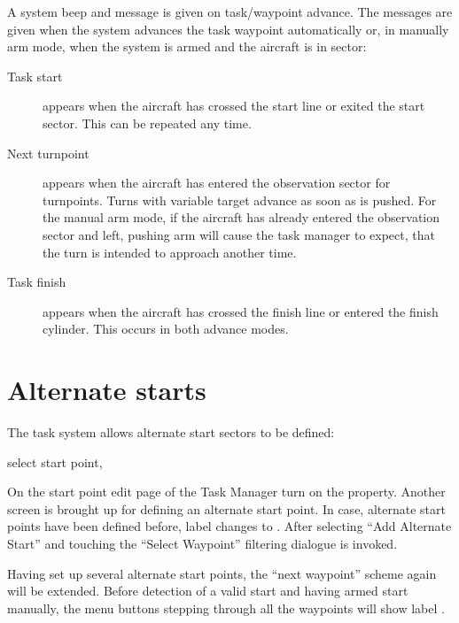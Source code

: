 A system beep and message is given on task/waypoint advance.  The
messages are given when the system advances the task waypoint
automatically or, in manually arm mode, when the system is armed and the
aircraft is in sector:
\begin{description}
\item[Task start]  appears when the aircraft has crossed the start line or
 exited the start sector. This can be repeated any time.
\item[Next turnpoint]  appears when the aircraft has entered the observation
 sector for turnpoints. Turns with variable target advance as soon as
  is pushed.  For the manual arm mode, if the
 aircraft has already entered the observation sector and left, pushing arm will
 cause the task manager to expect, that the turn is intended to approach
 another time.
\item[Task finish]  appears when the aircraft has crossed the finish line
 or entered the finish cylinder.  This occurs in both advance modes. 
\end{description}


\section{Alternate starts}\label{sec:alternate-starts}



The task system allows alternate start sectors to be defined:

\blink{} select start point, \blink{}

On the start point edit page of the Task Manager turn on the  property. Another screen is brought up for defining an 
alternate start point. In case, alternate start points have been defined before, label  changes to . After selecting ``Add Alternate Start'' and touching 
 the ``Select Waypoint'' filtering dialogue is invoked.

Having set up several alternate start points, the ``next waypoint'' scheme again will be extended. Before detection of a valid start and having armed start manually, the menu buttons stepping through all the waypoints will show label .

